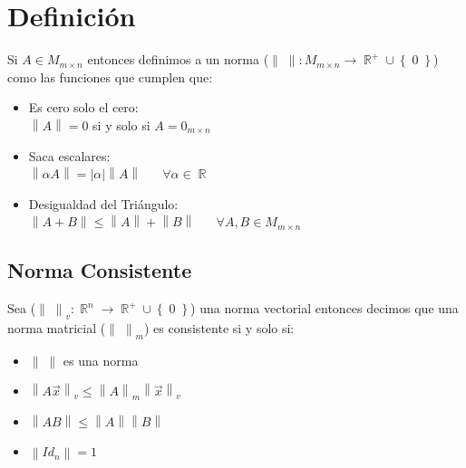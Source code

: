 \documentclass[12pt, fleqn]{report}                             %
\DeclareMathOperator \Space     {\quad}                         %
\theoremstyle{break}                                            %
\newcommand \lLongTo {\longrightarrow}                          %
\DeclareMathOperator \Reals        {\mathbb{R}}                 %
\newcommand{\Set}[1]            {\left\{ \; #1 \; \right\}}     %
\newcommand{\abs}[1]    {\left\lvert #1 \right\lvert}           %
\newcommand{\Abs}[1]    {\left\lVert #1 \right\lVert}           %
\begin{document}
        \section{Definición}

            Si $A \in M_{m \times n}$ entonces definimos a un norma 
            ($\Abs{\;}: M_{m \times n} \lLongTo \Reals^+ \cup \Set{0}$)
            como las funciones que cumplen que:
            \begin{itemize}
                \item 
                    Es cero solo el cero: \\
                    $\Abs{A} = 0$ si y solo si $A = 0_{m \times n}$
                
                \item 
                    Saca escalares: \\
                    $\Abs{\alpha A} = \abs{\alpha} \Abs{A} \Space \forall \alpha \in \Reals$
                
                \item 
                    Desigualdad del Triángulo: \\
                    $\Abs{A + B} \leq \Abs{A} + \Abs{B} \Space \forall A, B \in M_{m \times n}$
            \end{itemize}

            \subsection{Norma Consistente}

                Sea ($\Abs{\;}_v: \Reals^n \lLongTo \Reals^+ \cup \Set{0}$) una norma vectorial
                entonces decimos que una norma matricial ($\Abs{\;}_m$) es consistente si y solo si:

                \begin{itemize}
                    \item $\Abs{\;}$ es una norma
                    \item $\Abs{A \vec x}_v \leq \Abs{A}_m \Abs{\vec x}_v$
                    \item $\Abs{A B} \leq \Abs{A} \Abs{B}$
                    \item $\Abs{Id_n} = 1$
                \end{itemize}
\end{document}
